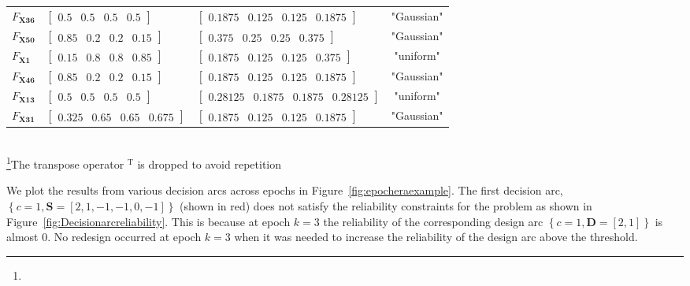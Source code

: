 \begin{table}[h!]
\begin{tabular}{l>{\centering\arraybackslash}p{4.2cm}>{\centering\arraybackslash}p{6cm}c}
	\hline
	$F_{\mathbf{X36}}$ & $\begin{bmatrix} 0.5 & 0.5 & 0.5 & 0.5 \end{bmatrix}$ & $\begin{bmatrix} 0.1875 & 0.125 & 0.125 & 0.1875 \end{bmatrix}$ & "Gaussian" \\
	$F_{\mathbf{X50}}$ & $\begin{bmatrix} 0.85 & 0.2 & 0.2 & 0.15 \end{bmatrix}$ & $\begin{bmatrix} 0.375 & 0.25 & 0.25 & 0.375 \end{bmatrix}$ & "Gaussian" \\
	$F_{\mathbf{X1}}$ & $\begin{bmatrix} 0.15 & 0.8 & 0.8 & 0.85 \end{bmatrix}$ & $\begin{bmatrix} 0.1875 & 0.125 & 0.125 & 0.375 \end{bmatrix}$ & "uniform" \\
	$F_{\mathbf{X46}}$ & $\begin{bmatrix} 0.85 & 0.2 & 0.2 & 0.15 \end{bmatrix}$ & $\begin{bmatrix} 0.1875 & 0.125 & 0.125 & 0.1875 \end{bmatrix}$ & "Gaussian" \\
	$F_{\mathbf{X13}}$ & $\begin{bmatrix} 0.5 & 0.5 & 0.5 & 0.5 \end{bmatrix}$ & $\begin{bmatrix} 0.28125 & 0.1875 & 0.1875 & 0.28125 \end{bmatrix}$ & "uniform" \\
	$F_{\mathbf{X31}}$ & $\begin{bmatrix} 0.325 & 0.65 & 0.65 & 0.675 \end{bmatrix}$ & $\begin{bmatrix} 0.1875 & 0.125 & 0.125 & 0.1875 \end{bmatrix}$ & "Gaussian" \\
	\hline\hline
	\end{tabular}\\
	\footnote[1]{}The transpose operator $^{\mathrm{T}}$ is dropped to avoid repetition
\end{table}

We plot the results from various decision arcs across epochs in Figure~\ref{fig:epocheraexample}. The first decision arc, $\left\{c=1,\mathbf{S}=\left[2,1,-1,-1,0,-1\right]\right\}$ (shown in red) does not satisfy the reliability constraints for the problem as shown in Figure~\ref{fig:Decisionarcreliability}. This is because at epoch $k=3$ the reliability of the corresponding design arc $\left\{c=1,\mathbf{D}=\left[2,1\right]\right\}$ is almost 0. No redesign occurred at epoch $k=3$ when it was needed to increase the reliability of the design arc above the threshold.


